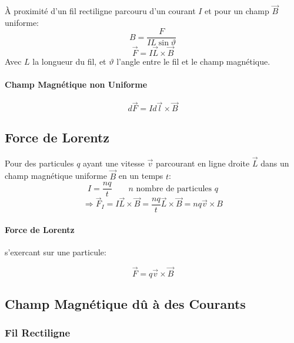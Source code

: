 \begin{multicols*}{2}
\begin{center}
    \end{center}
    
    À proximité d'un fil rectiligne parcouru d'un courant $I$ et pour un champ $\vec B$ uniforme:
    \[ B = \frac{F}{IL\sin\vartheta} \]
    \[ \vec F = I \vec L \times \vec B \]
    Avec $L$ la longueur du fil, et $\vartheta$ l'angle entre le fil et le champ magnétique.
    
    \paragraph{Champ Magnétique non Uniforme}
    
    \[ d\vec F = I d\vec l \times \vec B \]
    
    \subsection{Force de Lorentz}
    
    Pour des particules $q$ ayant une vitesse $\vec v$ parcourant en ligne droite $\vec L$ dans un champ magnétique uniforme $\vec B$ en un temps $t$:
    \[ I = \frac{nq}{t} \qquad \text{$n$ nombre de particules $q$}\]
    \[ \Rightarrow \vec F_I = I \vec L \times \vec B = \frac{nq}{t} \vec L \times \vec B = nq \vec v \times B \]
    
    \paragraph{Force de Lorentz} s'exercant sur une particule:
    
    \[ \vec F = q \vec v \times \vec B \]
    
    \subsection{Champ Magnétique dû à des Courants}
    
    \subsubsection{Fil Rectiligne}
    

\end{multicols*}

